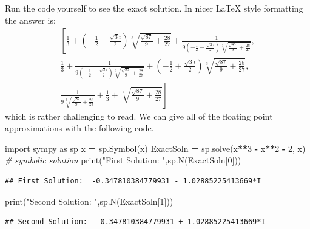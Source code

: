\documentclass[
]{book}
\newenvironment{Shaded}{\begin{snugshade}}{\end{snugshade}}
\newcommand{\BuiltInTok}[1]{#1}
\newcommand{\CommentTok}[1]{\textcolor[rgb]{0.56,0.35,0.01}{\textit{#1}}}
\newcommand{\DecValTok}[1]{\textcolor[rgb]{0.00,0.00,0.81}{#1}}
\newcommand{\ImportTok}[1]{#1}
\newcommand{\NormalTok}[1]{#1}
\newcommand{\OperatorTok}[1]{\textcolor[rgb]{0.81,0.36,0.00}{\textbf{#1}}}
\newcommand{\StringTok}[1]{\textcolor[rgb]{0.31,0.60,0.02}{#1}}
\theoremstyle{definition}
\theoremstyle{definition}
\theoremstyle{definition}
\theoremstyle{remark}
\begin{document}
Run the code yourself to see the exact solution. In nicer LaTeX style formatting the answer is:
\[\begin{aligned}
\left[ \frac{1}{3} + \left(- \frac{1}{2} - \frac{\sqrt{3} i}{2}\right)
    \sqrt[3]{\frac{\sqrt{87}}{9} + \frac{28}{27}} + \frac{1}{9 \left(- \frac{1}{2} -
    \frac{\sqrt{3} i}{2}\right) \sqrt[3]{\frac{\sqrt{87}}{9} + \frac{28}{27}}}, \right. \\
    \frac{1}{3} + \frac{1}{9 \left(- \frac{1}{2} + \frac{\sqrt{3} i}{2}\right)
    \sqrt[3]{\frac{\sqrt{87}}{9} + \frac{28}{27}}} + \left(- \frac{1}{2} + \frac{\sqrt{3}
i}{2}\right) \sqrt[3]{\frac{\sqrt{87}}{9} + \frac{28}{27}}, \\
\left. \frac{1}{9 \sqrt[3]{\frac{\sqrt{87}}{9} + \frac{28}{27}}} + \frac{1}{3} + \sqrt[3]{\frac{\sqrt{87}}{9} + \frac{28}{27}}\right]\end{aligned}\]
which is rather challenging to read. We can give all of the floating point approximations with the following code.

\begin{Shaded}
\begin{Highlighting}[]
\ImportTok{import}\NormalTok{ sympy }\ImportTok{as}\NormalTok{ sp}
\NormalTok{x }\OperatorTok{=}\NormalTok{ sp.Symbol(}\StringTok{\textquotesingle{}x\textquotesingle{}}\NormalTok{)}
\NormalTok{ExactSoln }\OperatorTok{=}\NormalTok{ sp.solve(x}\OperatorTok{**}\DecValTok{3} \OperatorTok{{-}}\NormalTok{ x}\OperatorTok{**}\DecValTok{2} \OperatorTok{{-}} \DecValTok{2}\NormalTok{, x) }\CommentTok{\# symbolic solution}
\BuiltInTok{print}\NormalTok{(}\StringTok{"First Solution: "}\NormalTok{,sp.N(ExactSoln[}\DecValTok{0}\NormalTok{]))}
\end{Highlighting}
\end{Shaded}

\begin{verbatim}
## First Solution:  -0.347810384779931 - 1.02885225413669*I
\end{verbatim}

\begin{Shaded}
\begin{Highlighting}[]
\BuiltInTok{print}\NormalTok{(}\StringTok{"Second Solution: "}\NormalTok{,sp.N(ExactSoln[}\DecValTok{1}\NormalTok{]))}
\end{Highlighting}
\end{Shaded}

\begin{verbatim}
## Second Solution:  -0.347810384779931 + 1.02885225413669*I
\end{verbatim}
\end{document}
